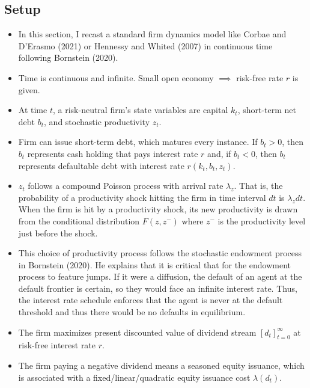 \documentclass{article}
\begin{document}
\pagebreak

\subsection*{Setup}

\begin{itemize}

\item In this section, I recast a standard firm dynamics model like Corbae and D'Erasmo (2021) or Hennessy and Whited (2007) in continuous time following Bornstein (2020).

\item Time is continuous and infinite. Small open economy $\implies$ risk-free rate $r$ is given.

\item At time $t$, a risk-neutral firm's state variables are capital $k_t$, short-term net debt $b_t$, and stochastic productivity $z_t$.

\item Firm can issue short-term debt, which matures every instance. If $b_t > 0$, then $b_t$ represents cash holding that pays interest rate $r$ and, if $b_t < 0$, then $b_t$ represents defaultable debt with interest rate $r(k_t, b_t, z_t)$.

\item $z_t$ follows a compound Poisson process with arrival rate $\lambda_z$. That is, the probability of a productivity shock hitting the firm in time interval $dt$ is $\lambda_z dt$. When the firm is hit by a productivity shock, its new productivity is drawn from the conditional distribution $F(z, z^-)$ where $z^-$ is the productivity level just before the shock.  

\item This choice of productivity process follows the stochastic endowment process in Bornstein (2020). He explains that it is critical that for the endowment process to feature jumps. If it were a diffusion, the default of an agent at the default frontier is certain, so they would face an infinite interest rate. Thus, the interest rate schedule enforces that the agent is never at the default threshold and thus there would be no defaults in equilibrium.

\item The firm maximizes present discounted value of dividend stream $[d_t]_{t=0}^\infty$ at risk-free interest rate $r$.

\item The firm paying a negative dividend means a seasoned equity issuance, which is associated with a fixed/linear/quadratic equity issuance cost $\lambda(d_t)$.


\end{itemize}
\end{document}
